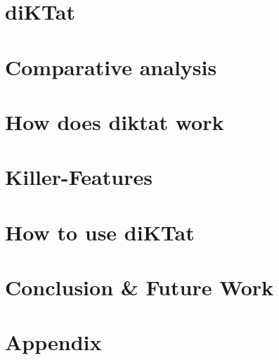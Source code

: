 \documentclass[acmlarge, screen, nonacm]{acmart}
\begin{document}
\begin{CJK*}{UTF8}{gbsn}
\section{diKTat}
\label{sec:diKTat}


\section{Comparative analysis}
\label{sec:compare}


\section{How does diktat work}
\label{sec:work}


\section{Killer-Features}
\label{sec:feature}


\section{How to use diKTat}
\label{sec:download}


\section{Conclusion \& Future Work}
\label{sec:conclusion}


\newpage
\nocite{*}



\newpage
\section{Appendix}
\label{sec:appendix}


\end{CJK*}
\end{document}
